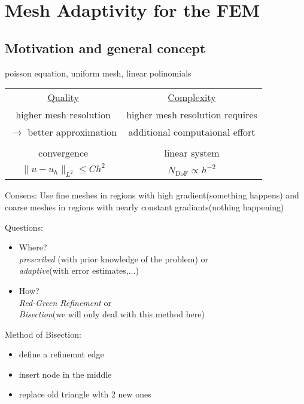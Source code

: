 \section{Mesh Adaptivity for the FEM}
\subsection{Motivation and general concept}

\begin{example}
	poisson equation, uniform mesh, linear polinomials
\end{example}
\begin{center}
	\begin{tabular}{c | c}
		\underline{Quality} & \underline{Complexity}\\
		higher mesh resolution & higher mesh resolution requires \\
		$\to$ better approximation & additional computaional effort\\
		&  \\
		convergence & linear system \\
		$\|u-u_h\|_{L^2} \leq C h^2$ & $N_{\text{DoF}}\propto h^{-2}$
	\end{tabular}
\end{center}

Consens: Use fine meshes in regions with high gradient(something happens) and coarse meshes in regions with nearly constant gradiants(nothing happening)\vspace{1cm}

Questions:
\begin{itemize}
	\item Where?\\
		\textit{prescribed} (with prior knowledge of the problem) or \\
		\textit{adaptive}(with error estimates,...)
	\item How?\\
		\textit{Red-Green Refinement} or \\
		\textit{Bisection}(we will only deal with this method here)
\end{itemize}

Method of Bisection:
\begin{itemize}
	\item define a refinemnt edge
	\item insert node in the middle
	\item replace old triangle wlth 2 new ones 
\end{itemize}


